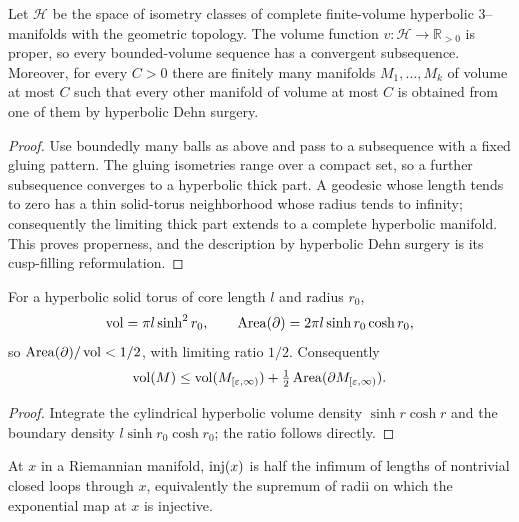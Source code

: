 \begin{theorem}
\label{thurston-ch05-jorgensen-properness}
Let $\mathcal H$ be the space of isometry classes of complete finite-volume hyperbolic $3$--manifolds with the geometric topology.  The volume function $v:\mathcal H\to\mathbb R_{>0}$ is proper, so every bounded-volume sequence has a convergent subsequence.  Moreover, for every $C>0$ there are finitely many manifolds $M_1,\ldots,M_k$ of volume at most $C$ such that every other manifold of volume at most $C$ is obtained from one of them by hyperbolic Dehn surgery.
\end{theorem}
\begin{proof}\sketch Use boundedly many balls as above and pass to a subsequence with a fixed gluing pattern.  The gluing isometries range over a compact set, so a further subsequence converges to a hyperbolic thick part.  A geodesic whose length tends to zero has a thin solid-torus neighborhood whose radius tends to infinity; consequently the limiting thick part extends to a complete hyperbolic manifold.  This proves properness, and the description by hyperbolic Dehn surgery is its cusp-filling reformulation.\end{proof}

\begin{proposition}
\label{thurston-ch05-solid-torus-volume-estimate}
For a hyperbolic solid torus of core length $l$ and radius $r_0$,
\[
\operatorname{vol}=\pi l\sinh^2r_0,\qquad \operatorname{Area}(\partial)=2\pi l\sinh r_0\cosh r_0,
\]
so $\operatorname{Area}(\partial)/\operatorname{vol}<1/2$, with limiting ratio $1/2$.  Consequently
\[
\operatorname{vol}(M)\le\operatorname{vol}(M_{[\varepsilon,\infty)})+\tfrac12\operatorname{Area}(\partial M_{[\varepsilon,\infty)}).
\]
\end{proposition}
\begin{proof}\sketch Integrate the cylindrical hyperbolic volume density $\sinh r\cosh r$ and the boundary density $l\sinh r_0\cosh r_0$; the ratio follows directly.\end{proof}

\begin{definition}
\label{thurston-ch05-injectivity-radius}
At $x$ in a Riemannian manifold, $\operatorname{inj}(x)$ is half the infimum of lengths of nontrivial closed loops through $x$, equivalently the supremum of radii on which the exponential map at $x$ is injective.
\end{definition}
